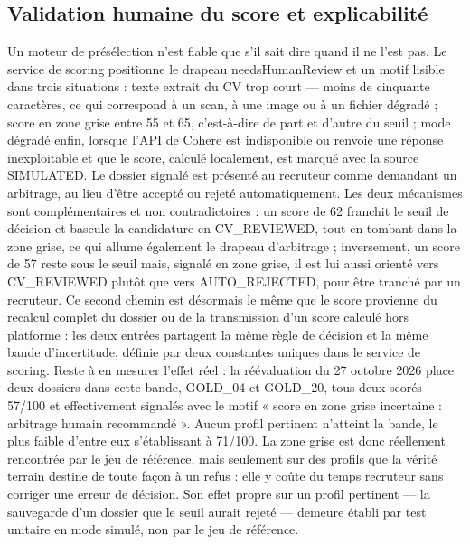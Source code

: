 \subsection{Validation humaine du score et explicabilité}
\label{sec_4_4_6}
Un moteur de présélection n’est fiable que s’il sait dire quand il ne l’est pas. Le service de scoring positionne le drapeau needs\-Human\-Review et un motif lisible dans trois situations : texte extrait du CV trop court — moins de cinquante caractères, ce qui correspond à un scan, à une image ou à un fichier dégradé ; score en zone grise entre 55 et 65, c’est-à-dire de part et d’autre du seuil ; mode dégradé enfin, lorsque l’API de Cohere est indisponible ou renvoie une réponse inexploitable et que le score, calculé localement, est marqué avec la source SIMULATED. Le dossier signalé est présenté au recruteur comme demandant un arbitrage, au lieu d’être accepté ou rejeté automatiquement. Les deux mécanismes sont complémentaires et non contradictoires : un score de 62 franchit le seuil de décision et bascule la candidature en CV\_REVIEWED, tout en tombant dans la zone grise, ce qui allume également le drapeau d’arbitrage ; inversement, un score de 57 reste sous le seuil mais, signalé en zone grise, il est lui aussi orienté vers CV\_REVIEWED plutôt que vers AUTO\_REJECTED, pour être tranché par un recruteur. Ce second chemin est désormais le même que le score provienne du recalcul complet du dossier ou de la transmission d’un score calculé hors platforme : les deux entrées partagent la même règle de décision et la même bande d’incertitude, définie par deux constantes uniques dans le service de scoring. Reste à en mesurer l’effet réel : la réévaluation du 27 octobre 2026 place deux dossiers dans cette bande, GOLD\_04 et GOLD\_20, tous deux scorés 57/100 et effectivement signalés avec le motif « score en zone grise incertaine : arbitrage humain recommandé ». Aucun profil pertinent n’atteint la bande, le plus faible d’entre eux s’établissant à 71/100. La zone grise est donc réellement rencontrée par le jeu de référence, mais seulement sur des profils que la vérité terrain destine de toute façon à un refus : elle y coûte du temps recruteur sans corriger une erreur de décision. Son effet propre sur un profil pertinent — la sauvegarde d’un dossier que le seuil aurait rejeté — demeure établi par test unitaire en mode simulé, non par le jeu de référence.

